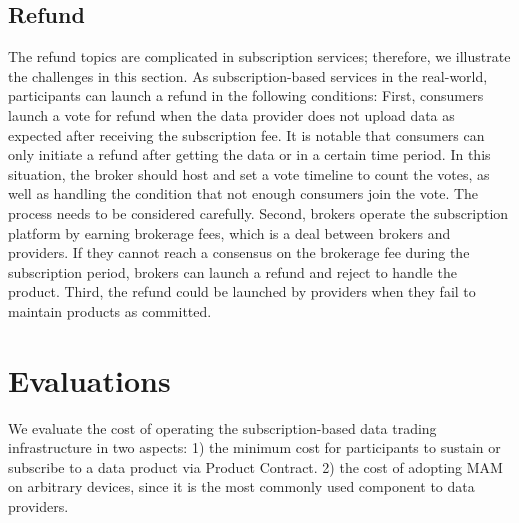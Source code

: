 \documentclass[10pt, conference, compsocconf]{IEEEtran}
\begin{document}
\subsection{Refund}
\label{section:refund}
The refund topics are complicated in subscription services; therefore, we illustrate the challenges in this section. As subscription-based services in the real-world, participants can launch a refund in the following conditions: First, consumers launch a vote for refund when the data provider does not upload data as expected after receiving the subscription fee. It is notable that consumers can only initiate a refund after getting the data or in a certain time period. In this situation, the broker should host and set a vote timeline to count the votes, as well as handling the condition that not enough consumers join the vote. The process needs to be considered carefully. Second, brokers operate the subscription platform by earning brokerage fees, which is a deal between brokers and providers. If they cannot reach a consensus on the brokerage fee during the subscription period, brokers can launch a refund and reject to handle the product. Third, the refund could be launched by providers when they fail to maintain products as committed.

\section{Evaluations}
\label{section:evaluation}
We evaluate the cost of operating the subscription-based data trading infrastructure in two aspects: 1) the minimum cost for participants to sustain or subscribe to a data product via Product Contract. 2) the cost of adopting MAM on arbitrary devices, since it is the most commonly used component to data providers.
\end{document}
